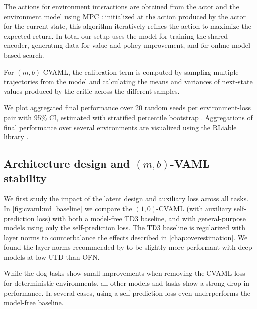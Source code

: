 The actions for environment interactions are obtained from the actor and the environment model using MPC \cite{hansen2022temporal}: initialized at the action produced by the actor for the current state, this algorithm iteratively refines the action to maximize the expected return.
In total our setup uses the model for training the shared encoder, generating data for value and policy improvement, and for online model-based search.

For $(m,b)$-CVAML, the calibration term is computed by sampling multiple trajectories from the model and calculating the means and variances of next-state values produced by the critic across the different samples.

We plot aggregated final performance over 20 random seeds per environment-loss pair with 95\% CI,  estimated with stratified percentile bootstrap \parencite{patterson2024empirical}.
Aggregations of final performance over several environments are visualized using the RLiable library \parencite{agarwal2021deep}.

\subsection{Architecture design and $(m,b)$-VAML stability}
 
We first study the impact of the latent design and auxiliary loss across all tasks.
In \autoref{fig:cvaml:mf_baseline} we compare the $(1,0)$-CVAML (with auxiliary self-prediction loss) with both a model-free TD3 baseline, and with general-purpose models using only the self-prediction loss.
The TD3 baseline is regularized with layer norms to counterbalance the effects described in \autoref{chap:overestimation}.
We found the layer norms recommended by \textcite{hansen2024tdmpc} to be slightly more performant with deep models at low UTD than OFN.

While the dog tasks show small improvements when removing the CVAML loss for deterministic environments, all other models and tasks show a strong drop in performance.
In several cases, using a self-prediction loss even underperforms the model-free baseline.

